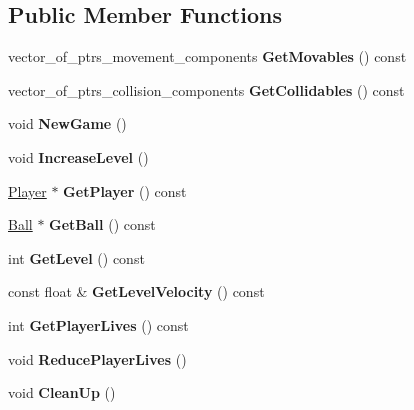 \subsection*{Public Member Functions}
\begin{DoxyCompactItemize}
\item 
\hypertarget{class_level_manager_a59a77f39ca9734a471b1464ca86df28b}{}vector\+\_\+of\+\_\+ptrs\+\_\+movement\+\_\+components {\bfseries Get\+Movables} () const \label{class_level_manager_a59a77f39ca9734a471b1464ca86df28b}

\item 
\hypertarget{class_level_manager_a9ba375b7c61050e848e1cccb8e6db26b}{}vector\+\_\+of\+\_\+ptrs\+\_\+collision\+\_\+components {\bfseries Get\+Collidables} () const \label{class_level_manager_a9ba375b7c61050e848e1cccb8e6db26b}

\item 
\hypertarget{class_level_manager_afdd15d07f007a6f7636c600f12a38217}{}void {\bfseries New\+Game} ()\label{class_level_manager_afdd15d07f007a6f7636c600f12a38217}

\item 
\hypertarget{class_level_manager_adfb57eb51fdc979747b72b053b85ad14}{}void {\bfseries Increase\+Level} ()\label{class_level_manager_adfb57eb51fdc979747b72b053b85ad14}

\item 
\hypertarget{class_level_manager_a3a532d8bfb73ebd2d4d730680fc3d6cc}{}\hyperlink{class_player}{Player} $\ast$ {\bfseries Get\+Player} () const \label{class_level_manager_a3a532d8bfb73ebd2d4d730680fc3d6cc}

\item 
\hypertarget{class_level_manager_ab3ed0f936c599c1d69428f97a0240459}{}\hyperlink{class_ball}{Ball} $\ast$ {\bfseries Get\+Ball} () const \label{class_level_manager_ab3ed0f936c599c1d69428f97a0240459}

\item 
\hypertarget{class_level_manager_a5d03144fac306ca2f6d6ece22ff7da64}{}int {\bfseries Get\+Level} () const \label{class_level_manager_a5d03144fac306ca2f6d6ece22ff7da64}

\item 
\hypertarget{class_level_manager_af11dba6a95782f794bf6ce919fd236f2}{}const float \& {\bfseries Get\+Level\+Velocity} () const \label{class_level_manager_af11dba6a95782f794bf6ce919fd236f2}

\item 
\hypertarget{class_level_manager_a7f4c3e316d943742d87622ca3abf59a7}{}int {\bfseries Get\+Player\+Lives} () const \label{class_level_manager_a7f4c3e316d943742d87622ca3abf59a7}

\item 
\hypertarget{class_level_manager_a4dc326928bc59c2c1d14f0efa537e10b}{}void {\bfseries Reduce\+Player\+Lives} ()\label{class_level_manager_a4dc326928bc59c2c1d14f0efa537e10b}

\item 
\hypertarget{class_level_manager_a50df37143640928f6ec730a1d9b59672}{}void {\bfseries Clean\+Up} ()\label{class_level_manager_a50df37143640928f6ec730a1d9b59672}

\end{DoxyCompactItemize}


